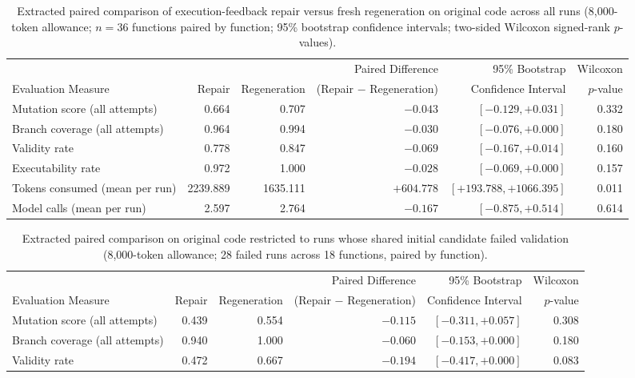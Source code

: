 \documentclass[11pt,a4paper]{article}
\begin{document}
\begin{table}[htbp]
\centering\footnotesize
\setlength{\tabcolsep}{4pt}
\caption{Extracted paired comparison of execution-feedback repair versus fresh regeneration on original code across all runs (8{,}000-token allowance; $n = 36$ functions paired by function; 95\% bootstrap confidence intervals; two-sided Wilcoxon signed-rank $p$-values).}
\label{tab:main-original}
\begin{tabular}{@{}lrrrrr@{}}
\toprule
 & & & Paired Difference & 95\% Bootstrap & Wilcoxon \\
Evaluation Measure & Repair & Regeneration & (Repair $-$ Regeneration) & Confidence Interval & $p$-value \\
\midrule
Mutation score (all attempts) & 0.664 & 0.707 & $-0.043$ & $[-0.129, +0.031]$ & 0.332 \\
Branch coverage (all attempts) & 0.964 & 0.994 & $-0.030$ & $[-0.076, +0.000]$ & 0.180 \\
Validity rate & 0.778 & 0.847 & $-0.069$ & $[-0.167, +0.014]$ & 0.160 \\
Executability rate & 0.972 & 1.000 & $-0.028$ & $[-0.069, +0.000]$ & 0.157 \\
Tokens consumed (mean per run) & 2239.889 & 1635.111 & $+604.778$ & $[+193.788, +1066.395]$ & 0.011 \\
Model calls (mean per run) & 2.597 & 2.764 & $-0.167$ & $[-0.875, +0.514]$ & 0.614 \\
\bottomrule
\end{tabular}
\end{table}

\begin{table}[htbp]
\centering\footnotesize
\setlength{\tabcolsep}{4pt}
\caption{Extracted paired comparison on original code restricted to runs whose shared initial candidate failed validation (8{,}000-token allowance; 28 failed runs across 18 functions, paired by function).}
\label{tab:fail-original}
\begin{tabular}{@{}lrrrrr@{}}
\toprule
 & & & Paired Difference & 95\% Bootstrap & Wilcoxon \\
Evaluation Measure & Repair & Regeneration & (Repair $-$ Regeneration) & Confidence Interval & $p$-value \\
\midrule
Mutation score (all attempts) & 0.439 & 0.554 & $-0.115$ & $[-0.311, +0.057]$ & 0.308 \\
Branch coverage (all attempts) & 0.940 & 1.000 & $-0.060$ & $[-0.153, +0.000]$ & 0.180 \\
Validity rate & 0.472 & 0.667 & $-0.194$ & $[-0.417, +0.000]$ & 0.083 \\
\bottomrule
\end{tabular}
\end{table}
\end{document}
